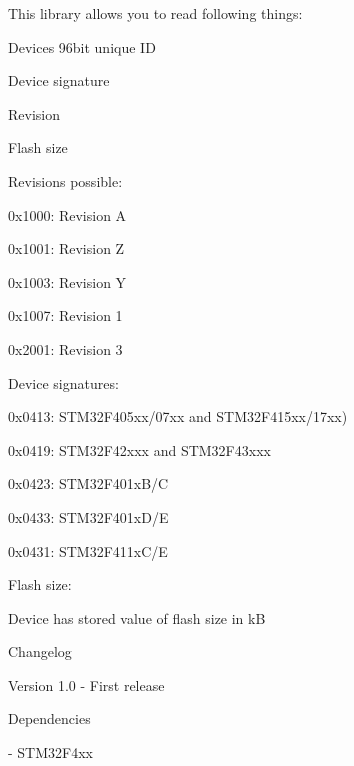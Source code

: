 \begin{DoxyParagraph}{This library allows you to read following things\+:}

\begin{DoxyItemize}
\item Device\textquotesingle{}s 96bit unique I\+D
\item Device signature
\item Revision
\item Flash size
\end{DoxyItemize}
\end{DoxyParagraph}
\begin{DoxyParagraph}{Revisions possible\+:}

\begin{DoxyItemize}
\item 0x1000\+: Revision A
\item 0x1001\+: Revision Z
\item 0x1003\+: Revision Y
\item 0x1007\+: Revision 1
\item 0x2001\+: Revision 3
\end{DoxyItemize}
\end{DoxyParagraph}
\begin{DoxyParagraph}{Device signatures\+:}

\begin{DoxyItemize}
\item 0x0413\+: S\+T\+M32\+F405xx/07xx and S\+T\+M32\+F415xx/17xx)
\item 0x0419\+: S\+T\+M32\+F42xxx and S\+T\+M32\+F43xxx
\item 0x0423\+: S\+T\+M32\+F401x\+B/\+C
\item 0x0433\+: S\+T\+M32\+F401x\+D/\+E
\item 0x0431\+: S\+T\+M32\+F411x\+C/\+E
\end{DoxyItemize}
\end{DoxyParagraph}
\begin{DoxyParagraph}{Flash size\+:}

\begin{DoxyItemize}
\item Device has stored value of flash size in k\+B
\end{DoxyItemize}
\end{DoxyParagraph}
\begin{DoxyParagraph}{Changelog}

\end{DoxyParagraph}
\begin{DoxyVerb} Version 1.0
   - First release
\end{DoxyVerb}


\begin{DoxyParagraph}{Dependencies}

\end{DoxyParagraph}
\begin{DoxyVerb} - STM32F4xx
\end{DoxyVerb}
 